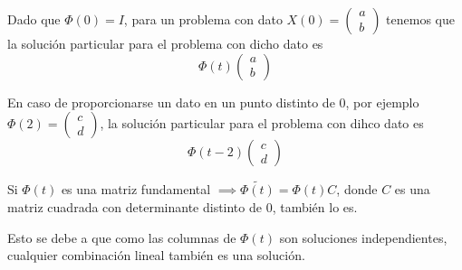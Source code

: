 \documentclass{mathnotes}
\begin{document}
\obs
Dado que $\Phi(0) = I$, para un problema con dato $X(0) = \begin{pmatrix}
a\\b
\end{pmatrix}$ tenemos que la solución particular para el problema con dicho dato es $$\Phi(t)\begin{pmatrix}
a\\b
\end{pmatrix}$$

En caso de proporcionarse un dato en un punto distinto de $0$, por ejemplo $\Phi(2) = \begin{pmatrix}
c\\d
\end{pmatrix}$, la solución particular para el problema con dihco dato es
$$\Phi(t-2)\begin{pmatrix}
c\\d
\end{pmatrix}$$

\obs
Si $\Phi(t)$ es una matriz fundamental $\implies \tilde{\Phi(t)} = \Phi(t)C$, donde $C$ es una matriz cuadrada con determinante distinto de $0$, también lo es.

Esto se debe a que como las columnas de $\Phi(t)$ son soluciones independientes, cualquier combinación lineal también es una solución.
\end{document}
